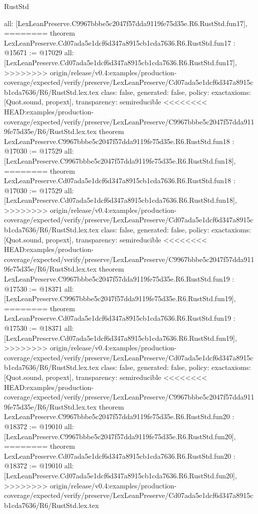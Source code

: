 \begin{lexlean}{RustStd}
\begin{coremodule}
{\begin{coremodule}
{{{{{{{{{{{{{{{{{{{{  all: [LexLeanPreserve.C9967bbbe5c2047f57dda9119fe75d35e.R6.RustStd.fun17],
========
theorem LexLeanPreserve.Cd07ada5e1dcf6d347a8915cb1cda7636.R6.RustStd.fun17 : @15671 := @17029 {
  all: [LexLeanPreserve.Cd07ada5e1dcf6d347a8915cb1cda7636.R6.RustStd.fun17],
>>>>>>>> origin/release/v0.4:examples/production-coverage/expected/verify/preserve/LexLeanPreserve/Cd07ada5e1dcf6d347a8915cb1cda7636/R6/RustStd.lex.tex
  class: false,
  generated: false,
  policy: exact{axioms: [Quot.sound, propext]},
  transparency: semireducible
}
<<<<<<<< HEAD:examples/production-coverage/expected/verify/preserve/LexLeanPreserve/C9967bbbe5c2047f57dda9119fe75d35e/R6/RustStd.lex.tex
theorem LexLeanPreserve.C9967bbbe5c2047f57dda9119fe75d35e.R6.RustStd.fun18 : @17030 := @17529 {
  all: [LexLeanPreserve.C9967bbbe5c2047f57dda9119fe75d35e.R6.RustStd.fun18],
========
theorem LexLeanPreserve.Cd07ada5e1dcf6d347a8915cb1cda7636.R6.RustStd.fun18 : @17030 := @17529 {
  all: [LexLeanPreserve.Cd07ada5e1dcf6d347a8915cb1cda7636.R6.RustStd.fun18],
>>>>>>>> origin/release/v0.4:examples/production-coverage/expected/verify/preserve/LexLeanPreserve/Cd07ada5e1dcf6d347a8915cb1cda7636/R6/RustStd.lex.tex
  class: false,
  generated: false,
  policy: exact{axioms: [Quot.sound, propext]},
  transparency: semireducible
}
<<<<<<<< HEAD:examples/production-coverage/expected/verify/preserve/LexLeanPreserve/C9967bbbe5c2047f57dda9119fe75d35e/R6/RustStd.lex.tex
theorem LexLeanPreserve.C9967bbbe5c2047f57dda9119fe75d35e.R6.RustStd.fun19 : @17530 := @18371 {
  all: [LexLeanPreserve.C9967bbbe5c2047f57dda9119fe75d35e.R6.RustStd.fun19],
========
theorem LexLeanPreserve.Cd07ada5e1dcf6d347a8915cb1cda7636.R6.RustStd.fun19 : @17530 := @18371 {
  all: [LexLeanPreserve.Cd07ada5e1dcf6d347a8915cb1cda7636.R6.RustStd.fun19],
>>>>>>>> origin/release/v0.4:examples/production-coverage/expected/verify/preserve/LexLeanPreserve/Cd07ada5e1dcf6d347a8915cb1cda7636/R6/RustStd.lex.tex
  class: false,
  generated: false,
  policy: exact{axioms: [Quot.sound, propext]},
  transparency: semireducible
}
<<<<<<<< HEAD:examples/production-coverage/expected/verify/preserve/LexLeanPreserve/C9967bbbe5c2047f57dda9119fe75d35e/R6/RustStd.lex.tex
theorem LexLeanPreserve.C9967bbbe5c2047f57dda9119fe75d35e.R6.RustStd.fun20 : @18372 := @19010 {
  all: [LexLeanPreserve.C9967bbbe5c2047f57dda9119fe75d35e.R6.RustStd.fun20],
========
theorem LexLeanPreserve.Cd07ada5e1dcf6d347a8915cb1cda7636.R6.RustStd.fun20 : @18372 := @19010 {
  all: [LexLeanPreserve.Cd07ada5e1dcf6d347a8915cb1cda7636.R6.RustStd.fun20],
>>>>>>>> origin/release/v0.4:examples/production-coverage/expected/verify/preserve/LexLeanPreserve/Cd07ada5e1dcf6d347a8915cb1cda7636/R6/RustStd.lex.tex
}}}}}}}}}}}}}}}}}}}}}}}}
\end{coremodule}}
\end{coremodule}
\end{lexlean}
